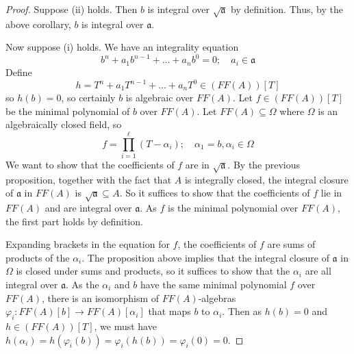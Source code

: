 \begin{proof}
    Suppose (ii) holds.
    Then \( b \) is integral over \( \sqrt{\mathfrak a} \) by definition.
    Thus, by the above corollary, \( b \) is integral over \( \mathfrak a \).

    Now suppose (i) holds.
    We have an integrality equation
    \[ b^n + a_1 b^{n-1} + \dots + a_n b^0 = 0;\quad a_i \in \mathfrak a \]
    Define
    \[ h = T^n + a_1 T^{n-1} + \dots + a_n T^0 \in (FF(A))[T] \]
    so \( h(b) = 0 \), so certainly \( b \) is algebraic over \( FF(A) \).
    Let \( f \in (FF(A))[T] \) be the minimal polynomial of \( b \) over \( FF(A) \).
    Let \( FF(A) \subseteq \Omega \) where \( \Omega \) is an algebraically closed field, so
    \[ f = \prod_{i=1}^\ell (T - \alpha_i);\quad \alpha_1 = b, \alpha_i \in \Omega \]
    We want to show that the coefficients of \( f \) are in \( \sqrt{\mathfrak a} \).
    By the previous proposition, together with the fact that \( A \) is integrally closed, the integral closure of \( \mathfrak a \) in \( FF(A) \) is \( \sqrt{\mathfrak a} \subseteq A \).
    So it suffices to show that the coefficients of \( f \) lie in \( FF(A) \) and are integral over \( \mathfrak a \).
    As \( f \) is the minimal polynomial over \( FF(A) \), the first part holds by definition.

    Expanding brackets in the equation for \( f \), the coefficients of \( f \) are sums of products of the \( \alpha_i \).
    The proposition above implies that the integral closure of \( \mathfrak a \) in \( \Omega \) is closed under sums and products, so it suffices to show that the \( \alpha_i \) are all integral over \( \mathfrak a \).
    As the \( \alpha_i \) and \( b \) have the same minimal polynomial \( f \) over \( FF(A) \), there is an isomorphism of \( FF(A) \)-algebras \( \varphi_i : FF(A)[b] \to FF(A)[\alpha_i] \) that maps \( b \) to \( \alpha_i \).
    Then as \( h(b) = 0 \) and \( h \in (FF(A))[T] \), we must have \( h(\alpha_i) = h(\varphi_i(b)) = \varphi_i(h(b)) = \varphi_i(0) = 0 \).
\end{proof}


